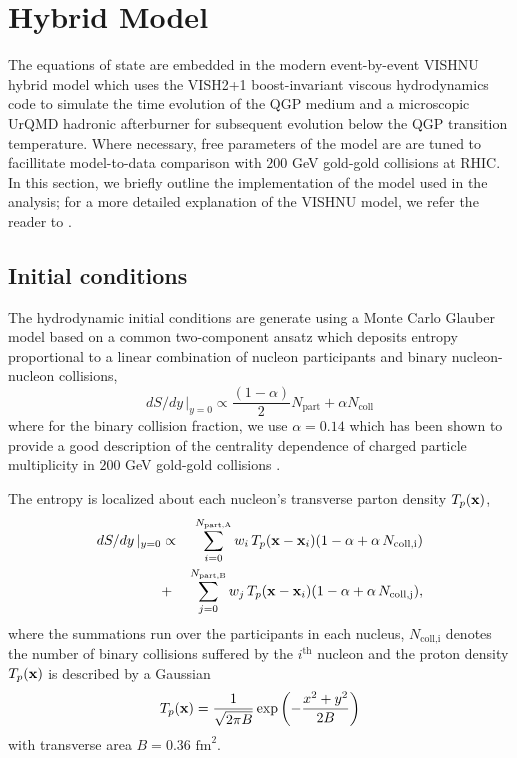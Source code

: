 \documentclass[aps,prc,reprint,amsmath,nofootinbib,superscriptaddress]{revtex4-1}
\begin{document}
\section{Hybrid Model}

The equations of state are embedded in the modern event-by-event VISHNU hybrid model which uses the VISH2+1 boost-invariant viscous hydrodynamics code to simulate the 
time evolution of the QGP medium and a microscopic UrQMD hadronic afterburner for subsequent evolution below the QGP transition temperature. Where necessary, free
parameters of the model are are tuned to facillitate model-to-data comparison with $200$ GeV gold-gold collisions at RHIC. In this section, we briefly outline
the implementation of the model used in the analysis; for a more detailed explanation of the VISHNU model, we refer the reader to \cite{}. 

\subsection{Initial conditions}
\label{initial_condition}

The hydrodynamic initial conditions are generate using a Monte Carlo Glauber model based on a common two-component ansatz which deposits entropy proportional to a linear combination 
of nucleon participants and binary nucleon-nucleon collisions,
\begin{equation}
 dS/dy \,\vert_{y=0} \propto \frac{(1-\alpha)}{2}N_\text{part} + \alpha N_\text{coll}
 \label{twocomponent}
\end{equation}
where for the binary collision fraction, we use $\alpha=0.14$ which has been shown to provide a good description of the centrality dependence of charged particle 
multiplicity in $200$ GeV gold-gold collisions \cite{?}.

The entropy is localized about each nucleon's transverse parton density $T_p({\bf x})$,
\begin{eqnarray}
 dS/dy \,\vert_{y=0} &\propto& \sum\limits_{i=0}^{N_\text{part,A}} w_i\, T_p({\bf x} - {\bf x}_i)(1-\alpha + \alpha\, N_\text{coll,i}) \nonumber \\
                     &+& \sum\limits_{j=0}^{N_\text{part,B}} w_j\, T_p({\bf x} - {\bf x}_i)(1-\alpha + \alpha\, N_\text{coll,j}),
 \label{glauber}
\end{eqnarray}
where the summations run over the participants in each nucleus, $N_\text{coll,i}$ denotes the number of binary collisions suffered by the $i^\text{th}$ nucleon 
and the proton density $T_p({\bf x})$ is described by a Gaussian
\begin{equation}
 T_p({\bf x}) = \frac{1}{\sqrt{2 \pi B}} \exp \left(-\frac{x^2+y^2}{2 B} \right)
\end{equation}
with transverse area $B = 0.36$ $\text{fm}^2$.
\end{document}
